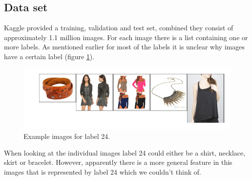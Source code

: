 \documentclass[10pt, a4paper]{article}
\begin{document}
\begin{multicols}{2}
		\section{Data set}
		Kaggle provided a training, validation and test set, combined they consist of approximately 1.1 million images. For each image there is a list containing one or more labels. As mentioned earlier for most of the labels it is unclear why images have a certain label (figure \ref{fig:label_24_examples}). 
		\\
		\begin{figure}[H]
            \centering
            \includegraphics[scale=.4]{img/label24_examples.png}
            \caption{Example images for label 24.}
            \label{fig:label_24_examples}
        \end{figure}
        
        When looking at the individual images label 24 could either be a shirt, necklace, skirt or bracelet. However, apparently there is a more general feature in this images that is represented by label 24 which we couldn't think of.
		

\end{multicols}
\end{document}
